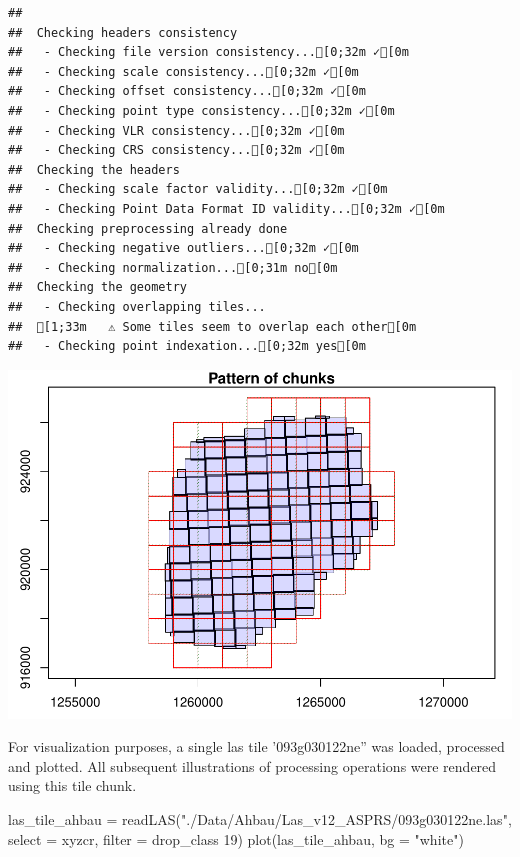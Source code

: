 \documentclass[
]{article}
\newenvironment{Shaded}{\begin{snugshade}}{\end{snugshade}}
\newcommand{\AttributeTok}[1]{\textcolor[rgb]{0.77,0.63,0.00}{#1}}
\newcommand{\FunctionTok}[1]{\textcolor[rgb]{0.00,0.00,0.00}{#1}}
\newcommand{\NormalTok}[1]{#1}
\newcommand{\OtherTok}[1]{\textcolor[rgb]{0.56,0.35,0.01}{#1}}
\newcommand{\StringTok}[1]{\textcolor[rgb]{0.31,0.60,0.02}{#1}}
\begin{document}
\begin{verbatim}
## 
##  Checking headers consistency
##   - Checking file version consistency...[0;32m ✓[0m
##   - Checking scale consistency...[0;32m ✓[0m
##   - Checking offset consistency...[0;32m ✓[0m
##   - Checking point type consistency...[0;32m ✓[0m
##   - Checking VLR consistency...[0;32m ✓[0m
##   - Checking CRS consistency...[0;32m ✓[0m
##  Checking the headers
##   - Checking scale factor validity...[0;32m ✓[0m
##   - Checking Point Data Format ID validity...[0;32m ✓[0m
##  Checking preprocessing already done 
##   - Checking negative outliers...[0;32m ✓[0m
##   - Checking normalization...[0;31m no[0m
##  Checking the geometry
##   - Checking overlapping tiles...
##  [1;33m   ⚠ Some tiles seem to overlap each other[0m
##   - Checking point indexation...[0;32m yes[0m
\end{verbatim}

\includegraphics{13_lidR_PointCloud_Processing_files/figure-latex/unnamed-chunk-4-1.pdf}

For visualization purposes, a single las tile '093g030122ne'' was
loaded, processed and plotted. All subsequent illustrations of
processing operations were rendered using this tile chunk.

\begin{Shaded}
\begin{Highlighting}[]
\NormalTok{las\_tile\_ahbau }\OtherTok{=} \FunctionTok{readLAS}\NormalTok{(}\StringTok{"./Data/Ahbau/Las\_v12\_ASPRS/093g030122ne.las"}\NormalTok{, }\AttributeTok{select =} \StringTok{\textquotesingle{}xyzcr\textquotesingle{}}\NormalTok{, }\AttributeTok{filter =} \StringTok{\textquotesingle{}{-}drop\_class 19\textquotesingle{}}\NormalTok{)}
\FunctionTok{plot}\NormalTok{(las\_tile\_ahbau, }\AttributeTok{bg =} \StringTok{"white"}\NormalTok{)}
\end{Highlighting}
\end{Shaded}
\end{document}
